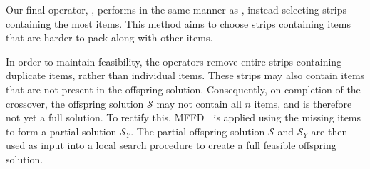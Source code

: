 \documentclass{elsarticle}
\begin{document}
Our final operator, , performs in the same manner as , instead selecting strips containing the most items. This method aims to choose strips containing items that are harder to pack along with other items. 

In order to maintain feasibility, the operators remove entire strips containing duplicate items, rather than individual items. These strips may also contain items that are not present in the offspring solution. Consequently, on completion of the crossover, the offspring solution $\mathcal{S}$ may not contain all $n$ items, and is therefore not yet a full solution. To rectify this, MFFD$^+$ is applied using the missing items to form a partial solution $\mathcal{S}_Y$. The partial offspring solution $\mathcal{S}$ and $\mathcal{S}_Y$ are then used as input into a local search procedure to create a full feasible offspring solution.
\end{document}
